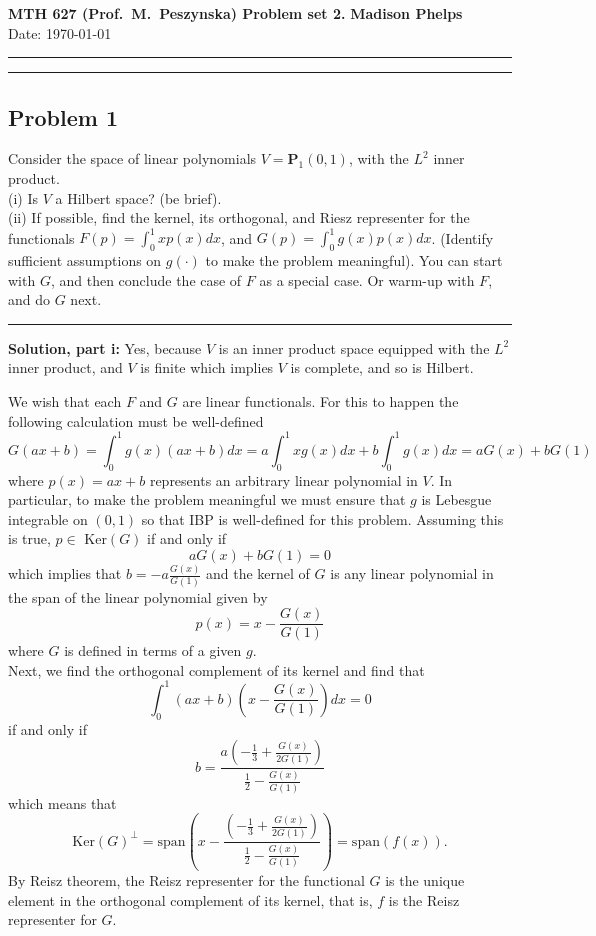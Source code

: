 \documentclass[12pt]{amsart}
\begin{document}
\noindent
\textbf{MTH 627 (Prof.~M.~Peszynska) Problem set 2. } \hfill \textbf{Madison Phelps}\\
\hfill Date: \today\\
\medskip \hrule \hrule \medskip


\subsection*{Problem 1} 
Consider the space of linear polynomials $V=\mathbf{P}_1(0,1)$, with the $L^2$ inner product. \\
%
(i) Is $V$ a Hilbert space? (be brief). \\
%
(ii) If possible, find the kernel, its orthogonal, and Riesz representer for the functionals $F(p)=\int_0^1 x p(x)dx$, and $G(p) = \int_0^1 g(x)p(x)dx$. (Identify sufficient assumptions on $g(\cdot)$ to make the problem meaningful). You can start with $G$, and then conclude the case of $F$ as a special case. Or warm-up with $F$, and do $G$ next. \\

\medskip \hrule \medskip
\noindent \textbf{Solution, part i:} Yes, because $V$ is an inner product space equipped with the $L^2$ inner product, and $V$ is finite which implies $V$ is complete, and so is Hilbert. 

\bigskip
{} We wish that each $F$ and $G$ are linear functionals. For this to happen the following calculation must be well-defined
	\[ G(ax+b) =  \int_0^1 g(x)(ax+b) dx = a \int_0^1 x g(x) dx + b \int_0^1 g(x) dx = a G(x) + b G(1)\]
where $p(x) = ax +b$ represents an arbitrary linear polynomial in $V$. In particular, to make the problem meaningful we must ensure that $g$ is Lebesgue integrable on $(0,1)$ so that IBP is well-defined for this problem. Assuming this is true, $p\in $ Ker$(G)$ if and only if 
	\[a G(x) + b G(1) = 0\]
which implies that $b = -a\frac{G(x)}{G(1)}$ and the kernel of $G$ is any linear polynomial in the span of the linear polynomial given by
	\[ p(x) = x - \frac{G(x)}{G(1)}\]
where $G$ is defined in terms of a given $g$.\\

Next, we find the orthogonal complement of its kernel and find that
	\[ \int_0^1 (ax+b) (x - \frac{G(x)}{G(1)})dx = 0\]
if and only if 
	\[ b = \frac{a \left( -\frac{1}{3} +\frac{G(x)}{2G(1)}\right)}{\frac{1}{2} - \frac{G(x)}{G(1)}}\]
which means that 
	\[ \text{Ker}(G)^\perp = \text{span}\left(x -  \frac{\left( -\frac{1}{3} +\frac{G(x)}{2G(1)}\right)}{\frac{1}{2} - \frac{G(x)}{G(1)}}\right) = \text{span}\left( f(x) \right).\]
By Reisz theorem, the Reisz representer for the functional $G$ is the unique element in the orthogonal complement of its kernel, that is, $f$ is the Reisz representer for $G$.\\
\end{document}
